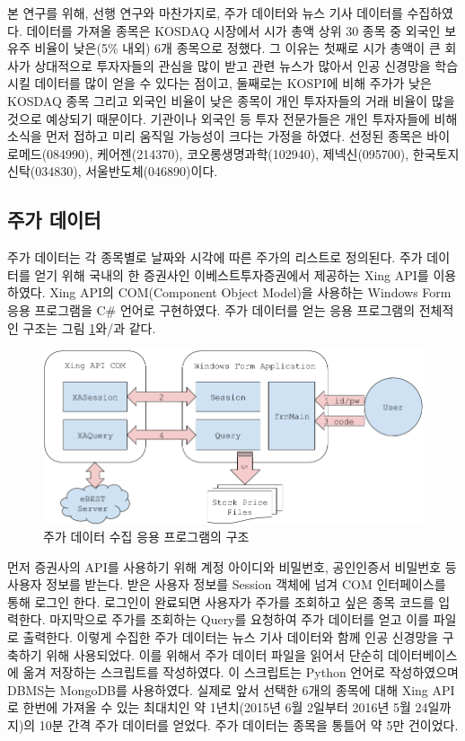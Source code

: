 \documentclass[a4paper,10pt]{article}
\begin{document}
본 연구를 위해, 선행 연구와 마찬가지로, 주가 데이터와 뉴스 기사 데이터를 수집하였다.
데이터를 가져올 종목은 KOSDAQ 시장에서 시가 총액 상위 30 종목 중 외국인 보유주 비율이 낮은(5\% 내외) 6개 종목으로 정했다.
그 이유는 첫째로 시가 총액이 큰 회사가 상대적으로 투자자들의 관심을 많이 받고 관련 뉴스가 많아서 인공 신경망을 학습 시킬 데이터를 많이 얻을 수 있다는 점이고,
둘째로는 KOSPI에 비해 주가가 낮은 KOSDAQ 종목 그리고 외국인 비율이 낮은 종목이 개인 투자자들의 거래 비율이 많을 것으로 예상되기 때문이다.
기관이나 외국인 등 투자 전문가들은 개인 투자자들에 비해 소식을 먼저 접하고 미리 움직일 가능성이 크다는 가정을 하였다.
선정된 종목은 바이로메드(084990), 케어젠(214370), 코오롱생명과학(102940), 제넥신(095700), 한국토지신탁(034830), 서울반도체(046890)이다.

\subsection{주가 데이터}

주가 데이터는 각 종목별로 날짜와 시각에 따른 주가의 리스트로 정의된다.
주가 데이터를 얻기 위해 국내의 한 증권사인 이베스트투자증권에서 제공하는 Xing API를 이용하였다.
Xing API의 COM(Component Object Model)을 사용하는 Windows Form 응용 프로그램을 C\# 언어로 구현하였다.
주가 데이터를 얻는 응용 프로그램의 전체적인 구조는 그림 \ref{fig:getting_price}와/과 같다.
\begin{figure}[h]
\includegraphics[width=\textwidth]{getting_price}
\centering
\caption{주가 데이터 수집 응용 프로그램의 구조}
\label{fig:getting_price}
\end{figure}
먼저 증권사의 API를 사용하기 위해 계정 아이디와 비밀번호, 공인인증서 비밀번호 등 사용자 정보를 받는다.
받은 사용자 정보를 Session 객체에 넘겨 COM 인터페이스를 통해 로그인 한다.
로그인이 완료되면 사용자가 주가를 조회하고 싶은 종목 코드를 입력한다.
마지막으로 주가를 조회하는 Query를 요청하여 주가 데이터를 얻고 이를 파일로 출력한다.
이렇게 수집한 주가 데이터는 뉴스 기사 데이터와 함께 인공 신경망을 구축하기 위해 사용되었다.
이를 위해서 주가 데이터 파일을 읽어서 단순히 데이터베이스에 옮겨 저장하는 스크립트를 작성하였다.
이 스크립트는 Python 언어로 작성하였으며 DBMS는 MongoDB를 사용하였다.
실제로 앞서 선택한 6개의 종목에 대해 Xing API로 한번에 가져올 수 있는 최대치인 약 1년치(2015년 6월 2일부터 2016년 5월 24일까지)의 10분 간격 주가 데이터를 얻었다.
주가 데이터는 종목을 통틀어 약 5만 건이었다.
\end{document}
